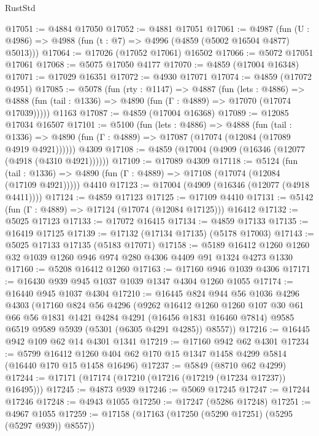 \begin{lexlean}{RustStd}
\begin{coremodule}
@17051 := @4884 @17050
@17052 := @4881 @17051
@17061 := @4987
    (fun (U : @4986) => @4988 (fun (t : @7) => @4996 (@4859 (@5002 @16504 @4877) @5013)))
@17064 := @17026 (@17052 @17061) @16502
@17066 := @5072 @17051 @17061
@17068 := @5075 @17050 @4177
@17070 := @4859 (@17004 @16348)
@17071 := @17029 @16351
@17072 := @4930 @17071
@17074 := @4859 (@17072 @4951)
@17085 := @5078
    (fun (rty : @1147) =>
    @4887
      (fun (lets : @4886) =>
      @4888 (fun (tail : @1336) => @4890 (fun (Γ : @4889) => @17070 (@17074 @17039)))))
    @1163
@17087 := @4859 (@17004 @16368)
@17089 := @12085 @17034 @16507
@17101 := @5100
    (fun (lets : @4886) =>
    @4888
      (fun (tail : @1336) =>
      @4890 (fun (Γ : @4889) => @17087 (@17074 (@12084 (@17089 @4919 @4921))))))
    @4309
@17108 := @4859 (@17004 (@4909 (@16346 (@12077 (@4918 (@4310 @4921))))))
@17109 := @17089 @4309
@17118 := @5124
    (fun (tail : @1336) => @4890 (fun (Γ : @4889) => @17108 (@17074 (@12084 (@17109 @4921)))))
    @4410
@17123 := @17004 (@4909 (@16346 (@12077 (@4918 @4411))))
@17124 := @4859 @17123
@17125 := @17109 @4410
@17131 := @5142 (fun (Γ : @4889) => @17124 (@17074 (@12084 @17125))) @16412
@17132 := @5025 @17123
@17133 := @17072 @16415
@17134 := @4859 @17133
@17135 := @16419 @17125
@17139 := @17132 (@17134 @17135) (@5178 @17003)
@17143 := @5025 @17133 @17135 (@5183 @17071)
@17158 := @5189 @16412 @1260 @1260 @32 @1039 @1260 @946 @974 @280 @4306 @4409 @91 @1324 @4273 @1330
@17160 := @5208 @16412 @1260
@17163 := @17160 @946 @1039 @4306
@17171 := @16430 @939 @945 @1037 @1039 @1347 @4304 @1260 @1055
@17174 := @16440 @945 @1037 @4304
@17210 := @16445
    @824
    @944
    @56
    @1036
    @4296
    @4303
    (@17160
      @824
      @56
      @4296
      (@9262
        @16412
        @1260
        @1260
        @107
        @30
        @61
        @66
        @56
        @1831
        @1421
        @4284
        @4291
        (@16456 @1831 @16460 @7814)
        @9585
        @6519
        @9589
        @5939
        (@5301 (@6305 @4291 @4285))
        @8557))
@17216 := @16445 @942 @109 @62 @14 @4301 @1341
@17219 := @17160 @942 @62 @4301
@17234 := @5799
    @16412
    @1260
    @404
    @62
    @170
    @15
    @1347
    @1458
    @4299
    @5814
    (@16440 @170 @15 @1458 @16496)
@17237 := @5849 (@8710 @62 @4299)
@17244 := @17171 (@17174 (@17210 (@17216 (@17219 (@17234 @17237)) @16495)))
@17245 := @4873 @939
@17246 := @5069 @17245
@17247 := @17244 @17246
@17248 := @4943 @1055
@17250 := @17247 (@5286 @17248)
@17251 := @4967 @1055
@17259 := @17158 (@17163 (@17250 (@5290 @17251) (@5295 (@5297 @939)) @8557))

\end{coremodule}
\end{lexlean}
